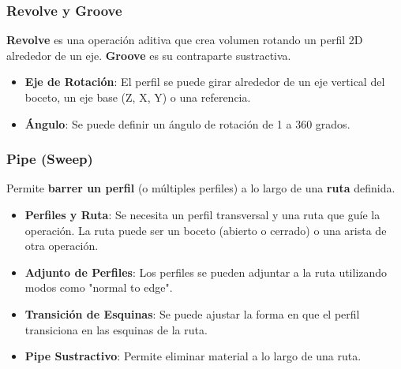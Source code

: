 \documentclass{article}
\begin{document}
\subsubsection*{Revolve y Groove}
\textbf{Revolve} es una operación aditiva que crea volumen rotando un perfil 2D alrededor de un eje. \textbf{Groove} es su contraparte sustractiva.
\begin{itemize}[noitemsep,topsep=0pt]
    \item \textbf{Eje de Rotación}: El perfil se puede girar alrededor de un eje vertical del boceto, un eje base (Z, X, Y) o una referencia.
    \item \textbf{Ángulo}: Se puede definir un ángulo de rotación de 1 a 360 grados.
\end{itemize}

\subsubsection*{Pipe (Sweep)}
Permite \textbf{barrer un perfil} (o múltiples perfiles) a lo largo de una \textbf{ruta} definida.
\begin{itemize}[noitemsep,topsep=0pt]
    \item \textbf{Perfiles y Ruta}: Se necesita un perfil transversal y una ruta que guíe la operación. La ruta puede ser un boceto (abierto o cerrado) o una arista de otra operación.
    \item \textbf{Adjunto de Perfiles}: Los perfiles se pueden adjuntar a la ruta utilizando modos como "normal to edge".
    \item \textbf{Transición de Esquinas}: Se puede ajustar la forma en que el perfil transiciona en las esquinas de la ruta.
    \item \textbf{Pipe Sustractivo}: Permite eliminar material a lo largo de una ruta.
\end{itemize}
\end{document}
